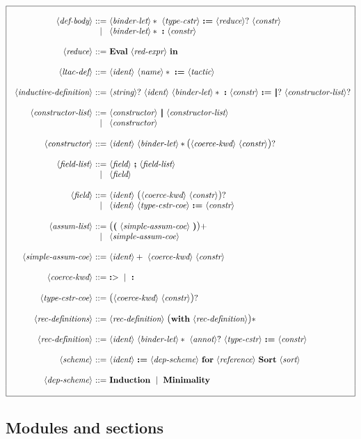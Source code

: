 \documentclass{article}
\makeatletter
\def\bfbar{\ensuremath{|\hskip -0.22em{}|\hskip -0.24em{}|}}
\def\TERMbar{\bfbar}
\def\GR#1{\text{\large(}#1\text{\large)}}
\def\NT#1{\langle\textit{#1}\rangle}
\def\TERM#1{{\bf\textrm{\bf #1}}}
\def\KWD#1{\TERM{#1}}
\def\STAR#1{#1*}
\def\STARGR#1{\GR{#1}*}
\def\PLUS#1{#1+}
\def\OPT#1{#1?}
\def\OPTGR#1{\GR{#1}?}
\newenvironment{cadre}
        {\begin{array}{|c|}\hline\\}
        {\\\\\hline\end{array}}
\newenvironment{rulebox}
        {$$\begin{cadre}\begin{array}{r@{~}c@{~}l@{}l@{}r}}
        {\end{array}\end{cadre}$$}
\def\DEFNT#1{\NT{#1} & ::= &}
\def\SEPDEF{\\\\}
\def\nlsep{\\&|&}
\newenvironment{rules}
        {\begin{center}\begin{rulebox}}
        {\end{rulebox}\end{center}}
\makeatother
\begin{document}
\begin{rules}
\DEFNT{def-body}
       \STAR{\NT{binder-let}}~\NT{type-cstr}~\KWD{:=}
       ~\OPT{\NT{reduce}}~\NT{constr}
\nlsep \STAR{\NT{binder-let}}~\KWD{:}~\NT{constr}
\SEPDEF
\DEFNT{reduce}
       \TERM{Eval}~\NT{red-expr}~\KWD{in}
\SEPDEF
\DEFNT{ltac-def}
       \NT{ident}~\STAR{\NT{name}}~\KWD{:=}~\NT{tactic}
\SEPDEF
\DEFNT{inductive-definition}
       \OPT{\NT{string}}~\NT{ident}~\STAR{\NT{binder-let}}~\KWD{:}
       ~\NT{constr}~\KWD{:=}
       ~\OPT{\TERMbar}~\OPT{\NT{constructor-list}}
\SEPDEF
\DEFNT{constructor-list}
       \NT{constructor}~\TERMbar~\NT{constructor-list}
\nlsep \NT{constructor}
\SEPDEF
\DEFNT{constructor}
       \NT{ident}~\STAR{\NT{binder-let}}\OPTGR{\NT{coerce-kwd}~\NT{constr}}
\SEPDEF
\DEFNT{field-list}
       \NT{field}~\KWD{;}~\NT{field-list}
\nlsep \NT{field}
\SEPDEF
\DEFNT{field}
       \NT{ident}~\OPTGR{\NT{coerce-kwd}~\NT{constr}}
\nlsep \NT{ident}~\NT{type-cstr-coe}~\KWD{:=}~\NT{constr}
\SEPDEF
\DEFNT{assum-list}
       \PLUS{\GR{\KWD{(}~\NT{simple-assum-coe}~\KWD{)}}}
\nlsep \NT{simple-assum-coe}
\SEPDEF
\DEFNT{simple-assum-coe}
       \PLUS{\NT{ident}}~\NT{coerce-kwd}~\NT{constr}
\SEPDEF
\DEFNT{coerce-kwd} \TERM{:$>$} ~\mid~ \KWD{:}
\SEPDEF
\DEFNT{type-cstr-coe} \OPTGR{\NT{coerce-kwd}~\NT{constr}}
\SEPDEF
\DEFNT{rec-definitions}
       \NT{rec-definition}~\STARGR{\KWD{with}~\NT{rec-definition}}
\SEPDEF
\DEFNT{rec-definition}
       \NT{ident}~\STAR{\NT{binder-let}}~\OPT{\NT{annot}}~\NT{type-cstr}
       ~\KWD{:=}~\NT{constr}
\SEPDEF
\DEFNT{scheme}
       \NT{ident}~\KWD{:=}~\NT{dep-scheme}~\KWD{for}~\NT{reference}
       ~\TERM{Sort}~\NT{sort}
\SEPDEF
\DEFNT{dep-scheme}
       \TERM{Induction}~\mid~\TERM{Minimality}
\end{rules}

\subsection{Modules and sections}
\end{document}
